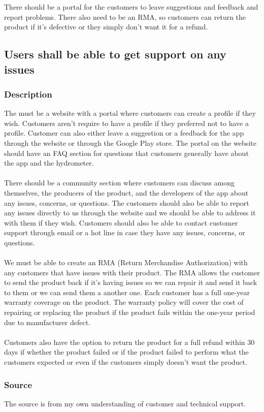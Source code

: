 There should be a portal for the customers to leave suggestions and feedback and report problems. There also need to be an RMA, so customers can return the product if it's defective or they simply don't want it for a refund.
\subsection{Users shall be able to get support on any issues}
\subsubsection{Description}
The must be a website with a portal where customers can create a profile if they wish. Customers aren't require to have a profile if they preferred not to have a profile. Customer can also either leave a suggestion or a feedback for the app through the website or through the Google Play store. The portal on the website should have an FAQ section for questions that customers generally have about the app and the hydrometer.
\\
\\
There should be a community section where customers can discuss among themselves, the producers of the product, and the developers of the app about any issues, concerns, or questions. The customers should also be able to report any issues directly to us through the website and we should be able to address it with them if they wish. Customers should also be able to contact customer support through email or a hot line in case they have any issues, concerns, or questions.
\\
\\
We must be able to create an RMA (Return Merchandise Authorization) with any customers that have issues with their product. The RMA allows the customer to send the product back if it's having issues so we can repair it and send it back to them or we can send them a another one. Each customer has a full one-year warranty coverage on the product. The warranty policy will cover the cost of repairing or replacing the product if the product fails within the one-year period due to manufacturer defect.
\\
\\
Customers also have the option to return the product for a full refund within 30 days if whether the product failed or if the product failed to perform what the customers expected or even if the customers simply doesn't want the product.
\subsubsection{Source}
The source is from my own understanding of customer and technical support.

